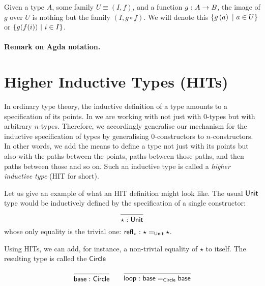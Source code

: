 \begin{defn}\label{defn:fam-img}
  Given a type $A$, some family $U \equiv (I, f)$, and a function $g\hspace{0.1mm}:\hspace{0.1mm}A \rightarrow B$, the
  image of $g$ over $U$ is nothing but the family $(I, g \circ f)$.
  We will denote this $\left\{  g\left( a \right) ~|~ a \in U  \right\}$ or $\left\{  g(f(i)) ~|~ i \in I  \right\}$.
\end{defn}

\paragraph*{Remark on Agda notation.}

\section{Higher Inductive Types (HITs)}

In ordinary type theory, the inductive definition of a type amounts to a specification of
its points. In \UF{} we are working with not just with $0$-types but with arbitrary
$n$-types. Therefore, we accordingly generalise our mechanism for the inductive
specification of types by generalising $0$-constructors to $n$-constructors. In other
words, we add the means to define a type not just with its points but also with the paths
between the points, paths between those paths, and then paths between those and so on.
Such an inductive type is called a \emph{higher inductive type} (HIT for short).

Let us give an example of what an HIT definition might look like. The usual $\mathsf{Unit}{}$
type would be inductively defined by the specification of a single constructor:
\begin{equation*}
  \begin{prooftree}
    \infer0{\oftyI{\star}{\unitty{}}}
  \end{prooftree}
\end{equation*}
whose only equality is the trivial one: $\mathsf{refl}_\star\hspace{0.1mm}:\hspace{0.1mm}\star =_{\mathsf{Unit}{}} \star$.

Using HITs, we can add, for instance, a non-trivial equality of $\star$ to itself. The
resulting type is called the $\mathsf{Circle}$

\begin{equation*}
  \begin{prooftree}
    \infer0{\oftyI{\mathsf{base}}{\mathsf{Circle}}}
  \end{prooftree}
  \hspace{2em}
  \begin{prooftree}
    \infer0{\oftyI{\mathsf{loop}}{\mathsf{base} =_{\mathsf{Circle}} \mathsf{base}}}
  \end{prooftree}
\end{equation*}

